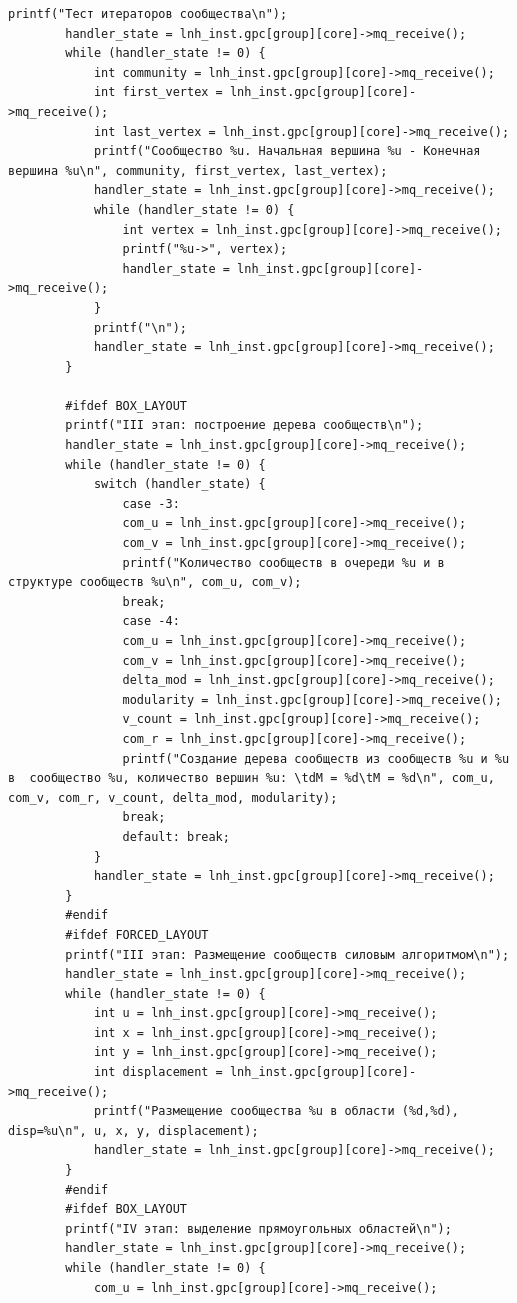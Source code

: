 \begin{lstlisting}[label=code, caption=Код чтения из файла]
		printf("Тест итераторов сообщества\n");
		handler_state = lnh_inst.gpc[group][core]->mq_receive();
		while (handler_state != 0) {
			int community = lnh_inst.gpc[group][core]->mq_receive();
			int first_vertex = lnh_inst.gpc[group][core]->mq_receive();
			int last_vertex = lnh_inst.gpc[group][core]->mq_receive();
			printf("Сообщество %u. Начальная вершина %u - Конечная вершина %u\n", community, first_vertex, last_vertex);
			handler_state = lnh_inst.gpc[group][core]->mq_receive();
			while (handler_state != 0) {
				int vertex = lnh_inst.gpc[group][core]->mq_receive();
				printf("%u->", vertex);
				handler_state = lnh_inst.gpc[group][core]->mq_receive();
			}
			printf("\n");
			handler_state = lnh_inst.gpc[group][core]->mq_receive();
		}
		
		#ifdef BOX_LAYOUT
		printf("III этап: построение дерева сообществ\n");
		handler_state = lnh_inst.gpc[group][core]->mq_receive();
		while (handler_state != 0) {
			switch (handler_state) {
				case -3:
				com_u = lnh_inst.gpc[group][core]->mq_receive();
				com_v = lnh_inst.gpc[group][core]->mq_receive();
				printf("Количество сообществ в очереди %u и в структуре сообществ %u\n", com_u, com_v);
				break;
				case -4:
				com_u = lnh_inst.gpc[group][core]->mq_receive();
				com_v = lnh_inst.gpc[group][core]->mq_receive();
				delta_mod = lnh_inst.gpc[group][core]->mq_receive();
				modularity = lnh_inst.gpc[group][core]->mq_receive();
				v_count = lnh_inst.gpc[group][core]->mq_receive();
				com_r = lnh_inst.gpc[group][core]->mq_receive();
				printf("Создание дерева сообществ из сообществ %u и %u в  сообщество %u, количество вершин %u: \tdM = %d\tM = %d\n", com_u, com_v, com_r, v_count, delta_mod, modularity);
				break;
				default: break;
			}
			handler_state = lnh_inst.gpc[group][core]->mq_receive();
		}
		#endif
		#ifdef FORCED_LAYOUT
		printf("III этап: Размещение сообществ силовым алгоритмом\n");
		handler_state = lnh_inst.gpc[group][core]->mq_receive();
		while (handler_state != 0) {
			int u = lnh_inst.gpc[group][core]->mq_receive();
			int x = lnh_inst.gpc[group][core]->mq_receive();
			int y = lnh_inst.gpc[group][core]->mq_receive();
			int displacement = lnh_inst.gpc[group][core]->mq_receive();
			printf("Размещение сообщества %u в области (%d,%d), disp=%u\n", u, x, y, displacement);
			handler_state = lnh_inst.gpc[group][core]->mq_receive();
		}
		#endif
		#ifdef BOX_LAYOUT
		printf("IV этап: выделение прямоугольных областей\n");
		handler_state = lnh_inst.gpc[group][core]->mq_receive();
		while (handler_state != 0) {
			com_u = lnh_inst.gpc[group][core]->mq_receive();

\end{lstlisting}
